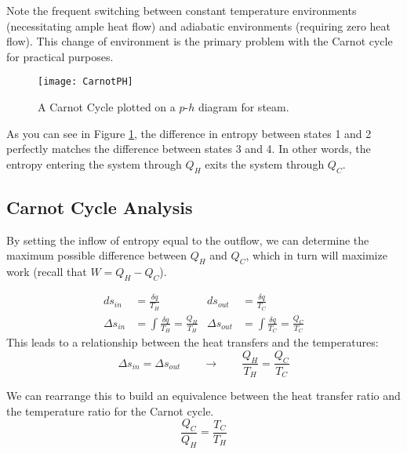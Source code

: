 

Note the frequent switching between constant temperature environments (necessitating ample heat flow) and adiabatic environments (requiring zero heat flow).  This change of environment is the primary problem with the Carnot cycle for practical purposes.

\begin{figure}[H]
  \centering
  \texttt{[image: CarnotPH]}
  \caption{A Carnot Cycle plotted on a $p$-$h$ diagram for steam.}
  \label{fig:carnotph}
\end{figure}

As you can see in Figure \ref{fig:carnotph}, the difference in entropy between states 1 and 2 perfectly matches the difference between states 3 and 4.  In other words, the entropy entering the system through $Q_H$ exits the system through $Q_C$.

\subsection{Carnot Cycle Analysis}
By setting the inflow of entropy equal to the outflow, we can determine the maximum possible difference between $Q_H$ and $Q_C$, which in turn will maximize work (recall that $W = Q_H - Q_C$).

\begin{align*}
  ds_{in} &= \frac{\delta q}{T_H} &  ds_{out} &= \frac{\delta q}{T_C}\\
  \Delta s_{in} &= \int \frac{\delta q}{T_H} = \frac{Q_H}{T_H}  &
  \Delta s_{out} &= \int \frac{\delta q}{T_C} = \frac{Q_C}{T_C} 
\end{align*}
This leads to a relationship between the heat transfers and the temperatures:
\begin{equation*}
 \Delta s_{in} = \Delta s_{out} \qquad \rightarrow \qquad \frac{Q_H}{T_H} = \frac{Q_C}{T_C}
\end{equation*}

We can rearrange this to build an equivalence between the heat transfer ratio and the temperature ratio for the Carnot cycle.
\begin{equation} \label{eq:QTequivalence}
  \frac{Q_C}{Q_H} = \frac{T_C}{T_H}
\end{equation}

